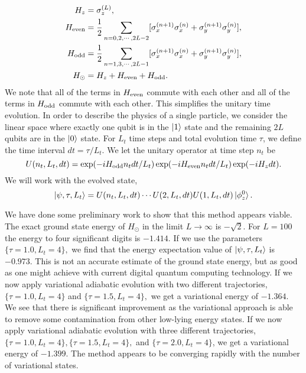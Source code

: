 \documentclass[11pt]{article}
\begin{document}
\begin{align}
H_z &= \sigma_z^{(L)}, \\
H_{\rm even} &= \frac{1}{2} \sum_{n=0,2,\cdots,2L-2} [\sigma_x^{(n+1)}\sigma_x^{(n)}
+ \sigma_y^{(n+1)}\sigma_y^{(n)}], \\
H_{\rm odd} &= \frac{1}{2} \sum_{n=1,3,\cdots,2L-1} [\sigma_x^{(n+1)}\sigma_x^{(n)}
+ \sigma_y^{(n+1)}\sigma_y^{(n)}], \\
H_\odot &= H_z + H_{\rm even} + H_{\rm odd}.
\end{align}
We note that all of the terms in $H_{\rm even}$ commute with each other and all of the terms in $H_{\rm odd}$ commute with each other.  This simplifies the unitary time evolution.  In order to describe the physics of a single particle, we consider the linear space where exactly one qubit is in the $\ket{1}$ state and the remaining $2L$ qubits are in the  $\ket{0}$ state.  For $L_t$ time steps and total evolution time $\tau$, we define the time interval $dt=\tau/L_t$.  We let the unitary operator at time step $n_t$ be
\begin{equation}
U(n_t,L_{t},dt) = \exp(-iH_{\rm odd}n_tdt/L_t)\exp(-iH_{\rm even}n_tdt/L_t)\exp(-iH_ zdt).   
\end{equation} 
We will work with the evolved state,
\begin{equation}
\ket{\psi,\tau,L_t} = U(n_t,L_{t},dt) \cdots U(2,L_{t},dt)U(1,L_{t},dt)\ket{\phi_z^0}. 
\end{equation}

We have done some preliminary work to show that this method appears
viable. The exact ground state energy of $H_\odot$ in the limit $L
\rightarrow \infty$ is $-\sqrt{2}$.  For $L = 100$ the energy to four
significant digits is $-1.414$. If we use the parameters $\{\tau =
1.0,L_t = 4\},$ we find that the energy expectation value of
$\ket{\psi,\tau,L_t}$ is $-0.973$.  This is not an accurate estimate
of the ground state energy, but as good as one might achieve with
current digital quantum computing technology.  If we now apply
variational adiabatic evolution with two different trajectories,
$\{\tau = 1.0,L_t = 4\}$ and $\{\tau = 1.5,L_t = 4\},$ we get a
variational energy of $-1.364$.  We see that there is significant
improvement as the variational approach is able to remove some
contamination from other low-lying energy states. If we now apply
variational adiabatic evolution with three different trajectories,
$\{\tau = 1.0,L_t = 4\}, \{\tau = 1.5,L_t = 4\},$ and $\{\tau =
2.0,L_t = 4\}$, we get a variational energy of $-1.399$.  The method
appears to be converging rapidly with the number of variational
states.
\end{document}
